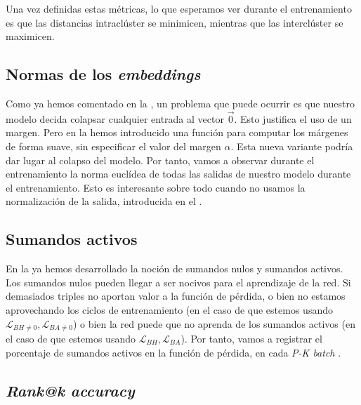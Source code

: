Una vez definidas estas métricas, lo que esperamos ver durante el entrenamiento es que las distancias intraclúster se minimicen, mientras que las interclúster se maximicen.

\subsection{Normas de los \textit{embeddings}} \label{isubs:normas_embeddings}

Como ya hemos comentado en la , un problema que puede ocurrir es que nuestro modelo decida colapsar cualquier entrada al vector $\vec{0}$. Esto justifica el uso de un margen. Pero en la  hemos introducido una función para computar los márgenes de forma suave, sin especificar el valor del margen $\alpha$. Esta nueva variante podría dar lugar al colapso del modelo. Por tanto, vamos a observar durante el entrenamiento la norma euclídea de todas las salidas de nuestro modelo durante el entrenamiento. Esto es interesante sobre todo cuando no usamos la normalización de la salida, introducida en el .

\subsection{Sumandos activos}

En la  ya hemos desarrollado la noción de sumandos nulos y sumandos activos. Los sumandos nulos pueden llegar a ser nocivos para el aprendizaje de la red. Si demasiados triples no aportan valor a la función de pérdida, o bien no estamos aprovechando los ciclos de entrenamiento (en el caso de que estemos usando $\mathcal{L}_{BH \neq 0}, \mathcal{L}_{BA \neq 0}$) o bien  la red puede que no aprenda de los sumandos activos (en el caso de que estemos usando $\mathcal{L}_{BH}, \mathcal{L}_{BA}$). Por tanto, vamos a registrar el porcentaje de sumandos activos en la función de pérdida, en cada \textit{P-K batch} \footnotemark.


\subsection{\textit{Rank@k accuracy}} \label{isubs:rank_at_k}

